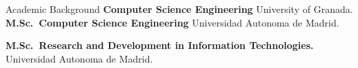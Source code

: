 \begin{rubric}{Academic Background}
\entry*[2014 -- 2018]%
	\textbf{Computer Science Engineering} University of Granada.
%
\entry*[2018 -- 2019]%
	\textbf{M.Sc.~Computer Science Engineering} Universidad Autonoma de Madrid.\par
\entry*[2018 -- 2019]%
	\textbf{M.Sc.~Research and Development in Information Technologies.} Universidad Autonoma de Madrid.\par
\end{rubric}